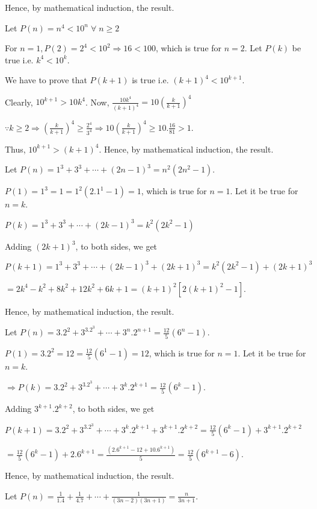   Hence, by mathematical induction, the result.
\item Let $P(n) = n^4 < 10^n\;\forall\;n\geq 2$

  For $n = 1, P(2) = 2^4 < 10^2 \Rightarrow 16 < 100$, which is true for $n = 2$. Let $P(k)$ be true
  i.e. $k^4 < 10^k$.

  We have to prove that $P(k + 1)$ is true i.e. $(k + 1)^4 < 10^{k + 1}$.

  Clearly, $10^{k + 1} > 10k^4$. Now, $\frac{10k^4}{(k + 1)^4} = 10\left(\frac{k}{k + 1}\right)^4$

  $\because k\geq 2\Rightarrow \left(\frac{k}{k + 1}\right)^4\geq \frac{2^4}{3^4}\Rightarrow
  10\left(\frac{k}{k + 1}\right)^4 \geq 10.\frac{16}{81} > 1$.

  Thus, $10^{k + 1} > (k + 1)^4$. Hence, by mathematical induction, the result.
\item Let $P(n) = 1^3 + 3^3 + \cdots + (2n - 1)^3 = n^2(2n^2 - 1)$.

  $P(1) = 1^3 = 1 = 1^2(2.1^1 - 1) = 1$, which is true for $n = 1$. Let it be true for $n = k$.

  $P(k) = 1^3 + 3^3 + \cdots + (2k - 1)^3 = k^2(2k^2 - 1)$

  Adding $(2k + 1)^3$, to both sides, we get

  $P(k + 1) = 1^3 + 3^3 + \cdots + (2k - 1)^3 + (2k + 1)^3 = k^2(2k^2 - 1) + (2k + 1)^3$

  $= 2k^4 - k^2 + 8k^2 + 12k^2 + 6k + 1 = (k + 1)^2[2(k + 1)^2 - 1]$.

  Hence, by mathematical induction, the result.
\item Let $P(n) = 3.2^2 + 3^3.2^3 + \cdots + 3^n.2^{n + 1} = \frac{12}{5}(6^n - 1)$.

  $P(1) = 3.2^2 = 12 = \frac{12}{5}(6^1 - 1) = 12$, which is true for $n = 1$. Let it be true for $n = k$.

  $\Rightarrow P(k) = 3.2^2 + 3^3.2^3 + \cdots + 3^k.2^{k + 1} = \frac{12}{5}(6^k - 1)$.

  Adding $3^{k+ 1}.2^{k + 2}$, to both sides, we get

  $P(k + 1) = 3.2^2 + 3^3.2^3 + \cdots + 3^k.2^{k + 1} + 3^{k + 1}.2^{k + 2} = \frac{12}{5}(6^k - 1) + 3^{k
    + 1}.2^{k + 2}$

  $= \frac{12}{5}(6^k - 1) + 2.6^{k + 1} = \frac{(2.6^{k + 1} - 12 + 10.6^{k + 1})}{5} = \frac{12}{5}(6^{k +
    1} - 6)$.

  Hence, by mathematical induction, the result.
\item Let $P(n) = \frac{1}{1.4} + \frac{1}{4.7} + \cdots + \frac{1}{(3n - 2)(3n + 1)} = \frac{n}{3n+ 1}$.

